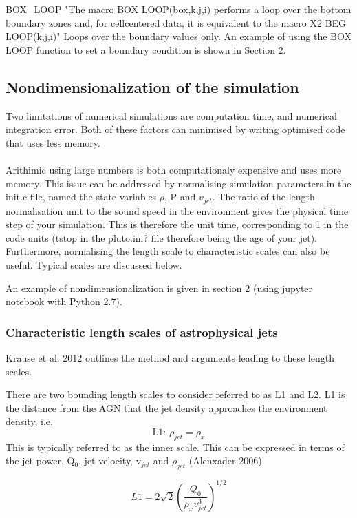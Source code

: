 \documentclass[12pt]{article}
\begin{document}
BOX\_LOOP
"The macro BOX LOOP(box,k,j,i) performs a loop over the bottom boundary zones and, for cellcentered
data, it is equivalent to the macro X2 BEG LOOP(k,j,i)"
Loops over the boundary values only.
An example of using the BOX LOOP function to set a boundary condition is shown in Section 2.

\subsection{Nondimensionalization of the simulation}
Two limitations of numerical simulations are computation time, and numerical integration error. Both of these factors can minimised by writing optimised code that uses less memory.\\
\\
Arithimic using large numbers is both computationaly expensive and uses more memory. This issue can be addressed by normalising simulation parameters in the init.c file, named the state variables $\rho$, P and $v_{jet}$. The ratio of the length normalisation unit to the sound speed in the environment gives the physical time step of your simulation. This is therefore the unit time, corresponding to 1 in the code units (tstop in the pluto.ini? file therefore being the age of your jet). Furthermore, normalising the length scale to characteristic scales can also be useful. Typical scales are discussed below.

An example of nondimensionalization is given in section 2 (using jupyter notebook with Python 2.7).

\subsubsection{Characteristic length scales of astrophysical jets}

Krause et al. 2012 outlines the method and arguments leading to these length scales.

There are two bounding length scales to consider referred to as L1 and L2. L1 is the distance from the AGN that the jet density approaches the environment density, i.e.
\begin{equation}
\text{L1: }\rho_{jet} = \rho_x
\end{equation}
This is typically referred to as the inner scale. This can be expressed in terms of the jet power, Q$_0$, jet velocity, v$_{jet}$ and $\rho_{jet}$ (Alenxader 2006). 

\begin{equation}
L1 = 2\sqrt{2}\left(\frac{Q_0}{\rho_x v_{jet}^3} \right)^{1/2}
\end{equation}
\end{document}

